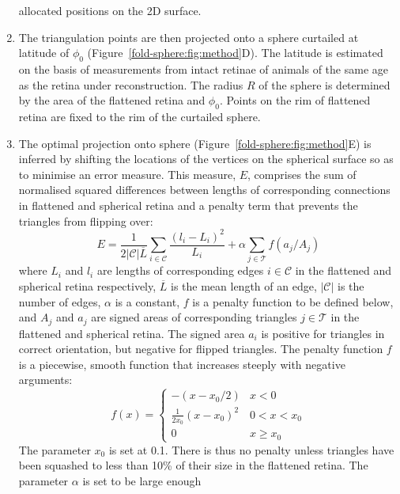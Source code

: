 \documentclass[10pt]{article}
\begin{document}
\begin{enumerate}
  allocated positions on the 2D surface.
\item The triangulation points are then projected onto a sphere
  curtailed at latitude of $\phi_0$
  (Figure~\ref{fold-sphere:fig:method}D). The latitude is estimated on
  the basis of measurements from intact retinae of animals of the same
  age as the retina under reconstruction. The radius $R$ of the sphere
  is determined by the area of the flattened retina and $\phi_0$.
  Points on the rim of flattened retina are fixed to the rim of the
  curtailed sphere.
\item The optimal projection onto sphere
  (Figure~\ref{fold-sphere:fig:method}E) is inferred by shifting the
  locations of the vertices on the spherical surface so as to minimise
  an error measure. This measure, $E$, comprises the sum of normalised
  squared differences between lengths of corresponding connections in
  flattened and spherical retina and a penalty term that prevents the
  triangles from flipping over:
  \begin{equation}
    E = \frac{1}{2|\mathcal{C}|\overline{L}} \sum_{i\in\mathcal{C}} \frac{(l_i - L_i)^2}{L_i}  
    + \alpha\sum_{j\in\mathcal{T}} f(a_j/A_j)
  \end{equation}
  where $L_i$ and $l_i$ are lengths of corresponding edges
  $i\in\mathcal{C}$ in the flattened and spherical retina
  respectively, $\overline{L}$ is the mean length of an edge,
  $|\mathcal{C}|$ is the number of edges, $\alpha$ is a constant, $f$
  is a penalty function to be defined below, and $A_j$ and $a_j$ are
  signed areas of corresponding triangles $j\in\mathcal{T}$ in the
  flattened and spherical retina.  The signed area $a_i$ is positive
  for triangles in correct orientation, but negative for flipped
  triangles. The penalty function $f$ is a piecewise, smooth function
  that increases steeply with negative arguments:
  \begin{equation}
    \label{retistruct_plos:eq:1}
    f(x) = \left\{
        \begin{array}{ll}
          -(x - x_0/2) & x < 0 \\
          \frac{1}{2x_0}(x - x_0)^2 & 0 < x <x_0 \\
          0 & x \ge x_0
          \end{array} \right.
  \end{equation}
  The parameter $x_0$ is set at 0.1. There is thus no penalty unless
  triangles have been squashed to less than 10\% of their size in the
  flattened retina.  The parameter $\alpha$ is set to be large enough

\end{enumerate}
\end{document}
